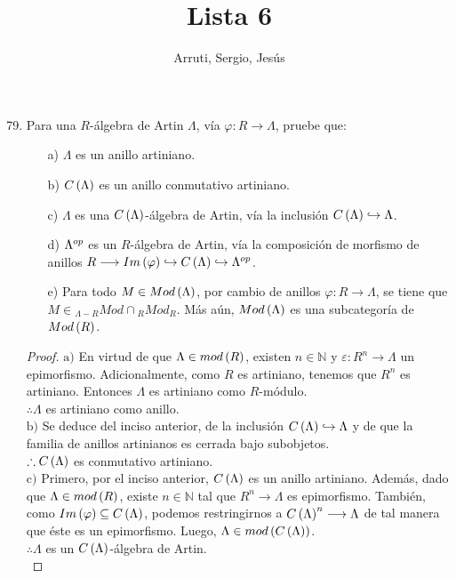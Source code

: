 \documentclass{article}
\title{Lista 6}
\author{Arruti, Sergio, Jesús}
\date{}
\begin{document}
	\maketitle
	\begin{enumerate}[label=\textbf{Ej \arabic*.}]
		\setcounter{enumi}{78}
		\item Para una $R$-álgebra de Artin $\Lambda$, vía $\varphi : R \longrightarrow \Lambda$, pruebe que:
		\begin{itemize}
			\item[a)] $\Lambda$ es un anillo artiniano.
			\item[b)] $C\left(\Lambda\right)$ es un anillo conmutativo artiniano.
			\item[c)] $\Lambda$ es una $C\left(\Lambda\right)$-álgebra de Artin, vía la inclusión $C\left(\Lambda\right)\hookrightarrow\Lambda$.
			\item[d)] ${\Lambda}^{op}$ es un $R$-álgebra de Artin, vía la composición de morfismo de anillos $R \longrightarrow Im\left(\varphi\right)\hookrightarrow C\left(\Lambda\right)\hookrightarrow{\Lambda}^{op}$.
			\item[e)] Para todo $M \in Mod\left(\Lambda\right)$, por cambio de anillos $\varphi : R \longrightarrow \Lambda$, se tiene que $M \in {}_{\Lambda - R}Mod \cap {}_{R}Mod_{R}$. Más aún, $Mod\left(\Lambda\right)$ es una subcategoría de $Mod\left(R\right)$.
		\end{itemize}
		\begin{proof}
			$\boxed{\text{a)}}$ En virtud de que $\Lambda \in mod\left(R\right)$, existen $n\in\mathbb{N}$ y $\varepsilon:R^{n}\longrightarrow\Lambda$ un epimorfismo. Adicionalmente, como $R$ es artiniano, tenemos que $R^{n}$ es artiniano. Entonces $\Lambda$ es artiniano como $R$-módulo.\\
			$\therefore\Lambda$ es artiniano como anillo.\\
		
			$\boxed{\text{b)}}$ Se deduce del inciso anterior, de la inclusión $C\left(\Lambda\right)\hookrightarrow\Lambda$ y de que la familia de anillos artinianos es cerrada bajo subobjetos.\\
			$\therefore C\left(\Lambda\right)$ es conmutativo artiniano.\\
		
			$\boxed{\text{c)}}$ Primero, por el inciso anterior, $C\left(\Lambda\right)$ es un anillo artiniano. Además, dado que $\Lambda \in mod\left(R\right)$, existe $n\in\mathbb{N}$ tal que $R^{n}\longrightarrow\Lambda$ es epimorfismo. También, como $Im\left(\varphi\right)\subseteq C\left(\Lambda\right)$, podemos restringirnos a $C\left(\Lambda\right)^{n}\longrightarrow\Lambda$ de tal manera que éste es un epimorfismo. Luego, $\Lambda \in mod\left(C\left(\Lambda\right)\right)$.\\
			$\therefore\Lambda$ es un $C\left(\Lambda\right)$-álgebra de Artin.\\
		

\end{proof}
\end{enumerate}
\end{document}
